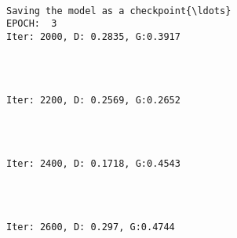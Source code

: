 \documentclass[11pt]{article}
\begin{document}
    \begin{Verbatim}[commandchars=\\\{\}]

Saving the model as a checkpoint{\ldots}
EPOCH:  3
Iter: 2000, D: 0.2835, G:0.3917
    \end{Verbatim}

    \begin{center}
    \end{center}
    { \hspace*{\fill} \\}
    
    \begin{Verbatim}[commandchars=\\\{\}]

Iter: 2200, D: 0.2569, G:0.2652
    \end{Verbatim}

    \begin{center}
    \end{center}
    { \hspace*{\fill} \\}
    
    \begin{Verbatim}[commandchars=\\\{\}]

Iter: 2400, D: 0.1718, G:0.4543
    \end{Verbatim}

    \begin{center}
    \end{center}
    { \hspace*{\fill} \\}
    
    \begin{Verbatim}[commandchars=\\\{\}]

Iter: 2600, D: 0.297, G:0.4744
    \end{Verbatim}

    \begin{center}
    \end{center}
    { \hspace*{\fill} \\}
    
\end{document}
